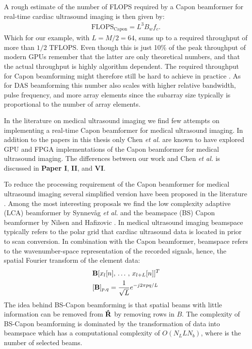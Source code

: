 A rough estimate of the number of FLOPS required by a Capon beamformer for real-time cardiac ultrasound imaging is then given by:
\begin{align}
\text{FLOPS}_{\text{Capon}} = L^3B_wf_c.
\end{align}
Which for our example, with $L=M/2=64$, sums up to a required throughput of more than $1/2$ TFLOPS. Even though this is just 10\% of the peak throughput of modern GPUs remember that the latter are only theoretical numbers, and that the actual throughput is highly algorithm dependent. The required throughput for Capon beamforming might therefore still be hard to achieve in practice \cite[\textbf{Paper II}]{So2011}. As for DAS beamforming this number also scales with higher relative bandwidth, pulse frequency, and more array elements since the subarray size typically is proportional to the number of array elements. 

In the literature on medical ultrasound imaging we find few attempts on implementing a real-time Capon beamformer for medical ultrasound imaging. In addition to the papers in this thesis only Chen \textit{et al.} \cite{Chen2011, Chen, Chen2011a} are known to have explored GPU and FPGA implementations of the Capon beamformer for medical ultrasound imaging. The differences between our work and Chen \textit{et al.} is discussed in \textbf{Paper I}, \textbf{II}, and \textbf{VI}.

To reduce the processing requirement of the Capon beamformer for medical ultrasound imaging several simplified version have been proposed in the literature \cite{Asl2012, Kim}. Among the most interesting proposals we find the low complexity adaptive (LCA) beamformer by Synnev\aa{}g \textit{et al.} \cite{Synnevag2011} and the beamspace (BS) Capon beamformer by Nilsen and Hafizovic \cite{Nilsen2009}. In medical ultrasound imaging beamspace typically refers to the polar grid that cardiac ultrasound data is located in prior to scan conversion. In combination with the Capon beamformer, beamspace refers to the wavenumber-space representation of the recorded signals, hence, the spatial Fourier transform of the element data: 
\begin{align}
&\mathbf{B}[x_l[n],\,\dotso,\,x_{l+L}[n]]^T\\
&[\mathbf{B}]_{p,q} = \frac{1}{\sqrt{L}}e^{-j 2 \pi p q / L}
\end{align}
The idea behind BS-Capon beamforming is that spatial beams with little information can be removed from $\mathbf{\hat{R}}$ by removing rows in $B$. The complexity of BS-Capon beamforming is dominated by the transformation of data into beamspace which has a computational complexity of $O(N_LLN_b)$, where  is the number of selected beams. 

